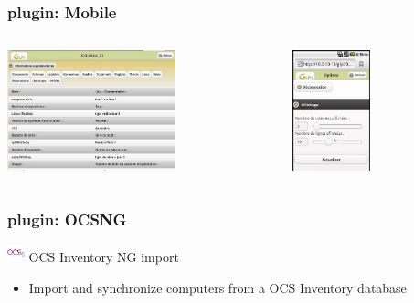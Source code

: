 \documentclass{beamer}
\begin{document}
\begin{frame}
    \frametitle{plugin: Mobile}

 \begin{columns}
 \begin{column}{0.5\textwidth}
    \includegraphics[height=3.5cm]{./pics/mobile/computer_detail_tablet.jpg}
 \end{column}
 \begin{column}{0.5\textwidth}
   \includegraphics[height=3.5cm]{./pics/mobile/options.jpg}
 \end{column}
\end{columns}

\end{frame}



\begin{frame}
    \frametitle{plugin: OCSNG}

    
    \begin{block}{\includegraphics[height=0.5cm]{./pics/plugins/ocsinventory.jpg} OCS Inventory NG import}
        \begin{itemize}
            \item Import and synchronize computers from a OCS Inventory database 
        \end{itemize}
    \end{block}

\end{frame}
\end{document}
